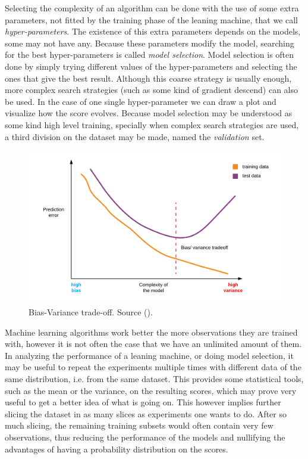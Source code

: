 Selecting the complexity of an algorithm can be done with the use of some extra parameters, not fitted by the training phase of the leaning machine, that we call \emph{hyper-parameters}. The existence of this extra parameters depends on the models, some may not have any. Because these parameters modify the model, searching for the best hyper-parameters is called \emph{model selection}. Model selection is often done by simply trying different values of the hyper-parameters and selecting the ones that give the best result. Al\-though this coarse strategy is usually enough, more complex search strategies (such as some kind of gradient descend) can also be used. In the case of one single hyper-parameter we can draw a plot and visualize how the score evolves. Because model selection may be understood as some kind high level training, specially when com\-plex search strategies are used, a third division on the dataset may be made, named the \emph{validation} set.

\begin{figure}[H]
    \centering
    \includegraphics[width=0.5\linewidth]{img/ch4/bias-and-variance.png}
    \caption{Bias-Variance trade-off. Source (\cite{bisong_machine_2021}).}
    \label{fig:ch4.biasvariance}
\end{figure}

Machine learning algorithms work better the more observations they are trained with, however it is not often the case that we have an unlimited amount of them. In analyzing the performance of a leaning machine, or doing model selection, it may be useful to repeat the experiments multiple times with different data of the same distribution, i.e. from the same dataset. This provides some statistical tools, such as the mean or the variance, on the resulting scores, which may prove very useful to get a better idea of what is going on. This however implies further slicing the dataset in as many slices as experiments one wants to do. After so much slicing, the remaining training subsets would often contain very few observations, thus reducing the performance of the models and nullifying the advantages of having a probability distribution on the scores. 

